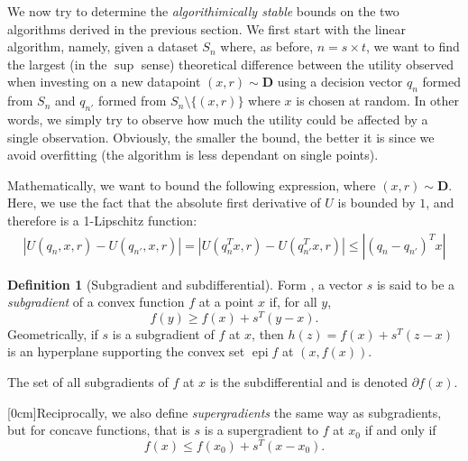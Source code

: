 \documentclass[11pt,fleqn]{article}
\DeclareMathOperator{\epi}{epi}
\newcommand{\dd}{\partial}
\let\oldmarginnote\marginnote
\renewcommand{\marginnote}[1]{\oldmarginnote{\footnotesize\emph{#1}}[0cm]}
\theoremstyle{plain}
\theoremstyle{definition}
\newtheorem*{deff}{Definition}
\begin{document}
We now try to determine the \emph{algorithimically stable} bounds on the two algorithms
derived in the previous section. We first start with the linear algorithm, namely, given a
dataset $S_n$ where, as before, $n=s\times t$, we want to find the largest (in the $\sup$
sense) theoretical difference between the utility observed when investing on a new
datapoint $(x,r)\sim\bm D$ using a decision vector $q_n$ formed from $S_n$ and $q_{n'}$
formed from $S_n\setminus \{(x,r)\}$ where $x$ is chosen at random. In other words, we
simply try to observe how much the utility could be affected by a single
observation. Obviously, the smaller the bound, the better it is since we avoid overfitting
(the algorithm is less dependant on single points).

Mathematically, we want to bound the following expression, where $(x,r)\sim\bm D$. Here,
we use the fact that the absolute first derivative of $U$ is bounded by $1$, and therefore
is a 1-Lipschitz function\cite{lipschitz}:
\begin{align*}
  |U(q_n,x,r) - U(q_{n'},x,r)| = |U(q_n^Tx,r) - U(q_{n'}^Tx,r)| \leq |(q_n - q_{n'})^Tx|
\end{align*}

\begin{deff}[Subgradient and subdifferential]
  Form \cite{rockafellar}, a vector $s$ is said to be a \emph{subgradient} of a convex
  function $f$ at a point $x$ if, for all $y$,
\begin{equation*}
  f(y) \geq f(x) + s^T(y-x).
\end{equation*}
Geometrically, if $s$ is a subgradient of $f$ at $x$, then $h(z) = f(x) + s^T(z-x)$ is an
hyperplane supporting the convex set $\epi f$ at $(x,f(x))$.

The set of all subgradients of $f$ at $x$ is the subdifferential and is denoted
$\dd f(x)$.

\marginnote{TODO!}Reciprocally, we also define \emph{supergradients} the same way as
subgradients, but for concave functions\cite{supergradients}, that is $s$ is a
supergradient to $f$ at $x_0$ if and only if 
\begin{equation*}
  f(x) \leq f(x_0) + s^T(x-x_0).
\end{equation*}
\end{deff}
\end{document}
